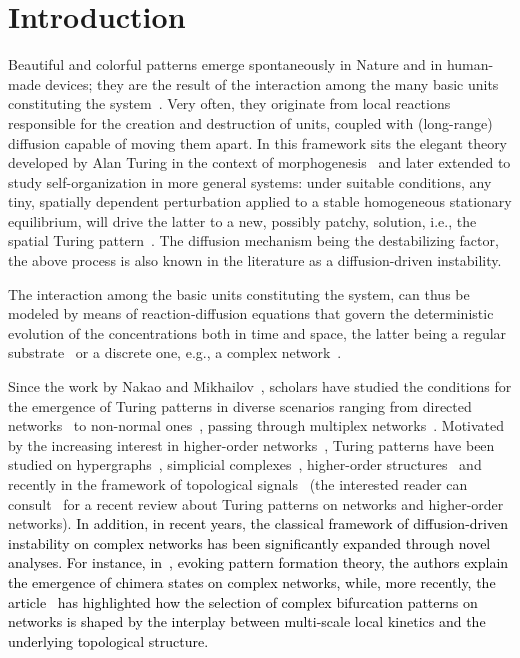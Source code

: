 \documentclass[aps,showpacs,preprintnumbers,amsmath,amssymb,twocolumn,superscriptaddress,floatfix,nofootinbib,10pt,pre]{revtex4-1}
\begin{document}

\maketitle
\section{Introduction}
\label{sec:intro}
Beautiful and colorful patterns emerge spontaneously in Nature and in human-made devices; they are the result of the interaction among the many basic units constituting the system~\cite{anderson,Nicolis1977,pastorsatorrasvespignani2010}. Very often, they originate from local reactions responsible for the creation and destruction of units, coupled with (long-range) diffusion capable of moving them apart. In this framework sits the elegant theory developed by Alan Turing in the context of morphogenesis~\cite{Turing52} and later extended to study self-organization in more general systems: under suitable conditions, any tiny, spatially dependent perturbation applied to a stable homogeneous stationary equilibrium, will drive the latter to a new, possibly patchy, solution, i.e., the spatial Turing pattern~\cite{pastorsatorrasvespignani2010}. The diffusion mechanism being the destabilizing factor, the above process is also known in the literature as a diffusion-driven instability.

The interaction among the basic units constituting the system, can thus be modeled by means of reaction-diffusion equations that govern the deterministic evolution of the concentrations both in time and space, the latter being a regular substrate~\cite{Murray2001} or a discrete one, e.g., a complex network~\cite{NM2010}. 

Since the work by Nakao and Mikhailov~\cite{NM2010}, scholars have studied the conditions for the emergence of Turing patterns in diverse scenarios ranging from directed networks~\cite{Asllani1} to non-normal ones~\cite{top_resilience,jtb}, passing through multiplex networks~\cite{Asllani2014,KHDG,busiello_homogLturing}. Motivated by the increasing interest in higher-order networks~\cite{battiston2020networks,BOCCALETTI20231,5.0151265,natphys,MillanEtAl2025}, Turing patterns have been studied on hypergraphs~\cite{carletti2020dynamical}, simplicial complexes~\cite{gao2023turing}, higher-order structures~\cite{muologallo,DORCHAIN2024115730} and recently in the framework of topological signals~\cite{turing_topological,MUOLO2024114312} (the interested reader can consult~\cite{rspa.2024.0235} for a recent review about Turing patterns on networks and higher-order networks). \textcolor{black}{In addition, in recent years, the classical framework of diffusion-driven instability on complex networks has been significantly expanded through novel analyses. For instance, in~\cite{asllani2025pattern}, evoking pattern formation theory, the authors explain the emergence of chimera states on complex networks, while, more recently, the article~\cite{khan2026bifurcation} has highlighted how the selection of complex bifurcation patterns on networks is shaped by the interplay between multi-scale local kinetics and the underlying topological structure.}
\end{document}
